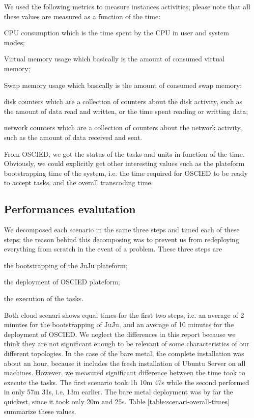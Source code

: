 \documentclass[a4paper, titlepage]{paper}
\numberwithin{figure}{section}
\numberwithin{table}{section}
\begin{document}
    We used the following metrics to measure instances activities; please note that all these values are measured as a function of the time:
    \begin{description*}
      \item[CPU consumption] which is the time spent by the CPU in user and system modes;
      \item[Virtual memory usage] which basically is the amount of consumed virtual memory;
      \item[Swap memory usage] which basically is the amount of consumed swap memory;
      \item[disk counters] which are a collection of counters about the disk activity, such as the amount of data read and written, or the time spent reading or writting data;
      \item[network counters] which are a collection of counters about the network activity, such as the amount of data received and sent.
    \end{description*}
    From OSCIED, we got the status of the tasks and units in function of the time. Obviously, we could explicitly get other interesting values such as the plateform bootstrapping time of the system, i.e. the time required for OSCIED to be ready to accept tasks, and the overall transcoding time.

    \subsection{Performances evalutation}
      We decomposed each scenario in the same three steps and timed each of these steps; the reason behind this decomposing was to prevent us from redeploying everything from scratch in the event of a problem. These three steps are
      \begin{inparaenum}[1.]
        \item the bootstrapping of the JuJu plateform;
        \item the deployment of OSCIED plateform;
        \item the execution of the tasks.
      \end{inparaenum}
      
      Both cloud scenari shows equal times for the first two steps, i.e. an average of 2 minutes for the bootstrapping of JuJu, and an average of 10 minutes for the deployment of OSCIED. We neglect the differences in this report because we think they are not significant enough to be relevant of some characteristics of our different topologies. In the case of the bare metal, the complete installation was about an hour, because it includes the fresh installation of Ubuntu Server on all machines. However, we measured significant difference between the time took to execute the tasks. The first scenario took 1h 10m 47s while the second performed in only 57m 31s, i.e. 13m earlier. The bare metal deployment was by far the quickest, since it took only 20m and 25s. Table \ref{table:scenari-overall-times} summarize these values.
\end{document}
